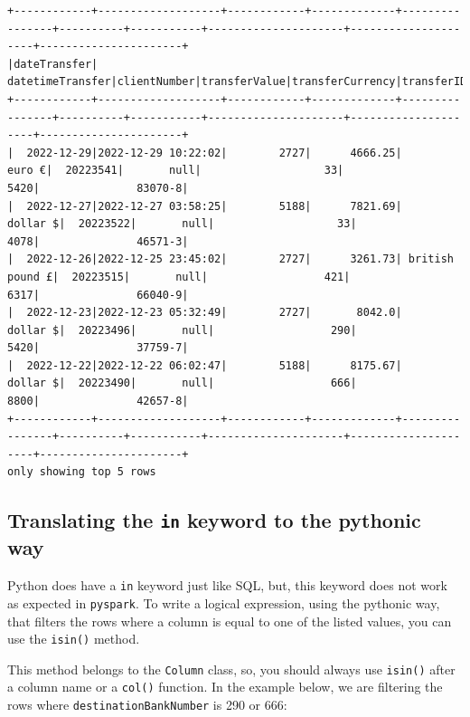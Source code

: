 \documentclass[
  11pt,
  letterpaper,
  DIV=11,
  numbers=noendperiod]{scrreprt}
\begin{document}
\begin{verbatim}
+------------+-------------------+------------+-------------+----------------+----------+-----------+---------------------+---------------------+----------------------+
|dateTransfer|   datetimeTransfer|clientNumber|transferValue|transferCurrency|transferID|transferLog|destinationBankNumber|destinationBankBranch|destinationBankAccount|
+------------+-------------------+------------+-------------+----------------+----------+-----------+---------------------+---------------------+----------------------+
|  2022-12-29|2022-12-29 10:22:02|        2727|      4666.25|          euro €|  20223541|       null|                   33|                 5420|               83070-8|
|  2022-12-27|2022-12-27 03:58:25|        5188|      7821.69|        dollar $|  20223522|       null|                   33|                 4078|               46571-3|
|  2022-12-26|2022-12-25 23:45:02|        2727|      3261.73| british pound £|  20223515|       null|                  421|                 6317|               66040-9|
|  2022-12-23|2022-12-23 05:32:49|        2727|       8042.0|        dollar $|  20223496|       null|                  290|                 5420|               37759-7|
|  2022-12-22|2022-12-22 06:02:47|        5188|      8175.67|        dollar $|  20223490|       null|                  666|                 8800|               42657-8|
+------------+-------------------+------------+-------------+----------------+----------+-----------+---------------------+---------------------+----------------------+
only showing top 5 rows
\end{verbatim}

\hypertarget{translating-the-in-keyword-to-the-pythonic-way}{%
\subsection{\texorpdfstring{Translating the \texttt{in} keyword to the
pythonic
way}{Translating the in keyword to the pythonic way}}\label{translating-the-in-keyword-to-the-pythonic-way}}

Python does have a \texttt{in} keyword just like SQL, but, this keyword
does not work as expected in \texttt{pyspark}. To write a logical
expression, using the pythonic way, that filters the rows where a column
is equal to one of the listed values, you can use the \texttt{isin()}
method.

This method belongs to the \texttt{Column} class, so, you should always
use \texttt{isin()} after a column name or a \texttt{col()} function. In
the example below, we are filtering the rows where
\texttt{destinationBankNumber} is 290 or 666:
\end{document}
